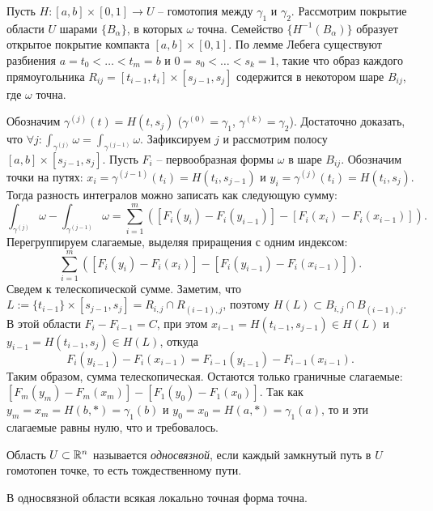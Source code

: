 \begin{myproof}
	Пусть $H : [a, b] \times [0, 1] \to U$ -- гомотопия между $\gamma_1$ и $\gamma_2$.
	Рассмотрим покрытие области $U$ шарами $\{B_\alpha\}$, в которых $\omega$ точна. Семейство $\{H^{-1}(B_\alpha)\}$ образует открытое покрытие компакта $[a, b] \times [0, 1]$. 
	По лемме Лебега существуют разбиения $a = t_0 < \dotsc < t_m = b$ и $0 = s_0 < \dotsc < s_k = 1$, такие что образ каждого прямоугольника $R_{ij} = [t_{i-1}, t_i] \times [s_{j-1}, s_j]$ содержится в некотором шаре $B_{ij}$, где $\omega$ точна.
	
	\vspace{5pt}
	Обозначим $\gamma^{(j)}(t) = H(t, s_j)$ ($\gamma^{(0)} = \gamma_1$, $\gamma^{(k)} = \gamma_2$). Достаточно доказать, что $\forall j : \int_{\gamma^{(j)}} \omega = \int_{\gamma^{(j - 1)}} \omega$.
	Зафиксируем $j$ и рассмотрим полосу $[a, b] \times [s_{j-1}, s_j]$. Пусть $F_i$ -- первообразная формы $\omega$ в шаре $B_{ij}$.
	Обозначим точки на путях: $x_i = \gamma^{(j-1)}(t_i) = H(t_i, s_{j-1})$ и $y_i = \gamma^{(j)}(t_i) = H(t_i, s_j)$.
	Тогда разность интегралов можно записать как следующую сумму:
	\[ \int_{\gamma^{(j)}} \omega - \int_{\gamma^{(j - 1)}} \omega = \sum \limits_{i=1}^{m} \left( [F_i(y_i) - F_i(y_{i-1})] - [F_i(x_i) - F_i(x_{i-1})] \right). \]
	Перегруппируем слагаемые, выделяя приращения с одним индексом:
	\[ \sum \limits_{i=1}^{m} \left( [F_i(y_i) - F_i(x_i)] - [F_i(y_{i-1}) - F_i(x_{i-1})] \right). \]
	Сведем к телескопической сумме.
	Заметим, что $L := \{t_{i-1}\} \times [s_{j-1}, s_j] = R_{i,j} \cap R_{(i-1),j}$, поэтому $H(L) \subset B_{i,j} \cap B_{(i-1),j}$. В этой области $F_i - F_{i-1} = C$, при этом $x_{i-1} = H(t_{i-1}, s_{j-1}) \in H(L)$ и $y_{i-1} = H(t_{i-1}, s_j) \in H(L)$, откуда 
	\[ F_i(y_{i-1}) - F_i(x_{i-1}) = F_{i-1}(y_{i-1}) - F_{i-1}(x_{i-1}). \]
	Таким образом, сумма телескопическая. Остаются только граничные слагаемые:
	$[F_m(y_m) - F_m(x_m)] - [F_1(y_0) - F_1(x_0)]$. 
	Так как $y_m = x_m = H(b, *) = \gamma_1(b)$ и $y_0 = x_0 = H(a, *) = \gamma_1(a)$, то и эти слагаемые равны нулю, что и требовалось.
\end{myproof}

\begin{definition}
	Область $U \subset \mathbb{R}^n$ называется \textit{односвязной}, если каждый замкнутый путь в $U$ гомотопен точке, то есть тождественному пути. 
\end{definition}

\begin{corollary}
	В односвязной области всякая локально точная форма точна.
\end{corollary}

